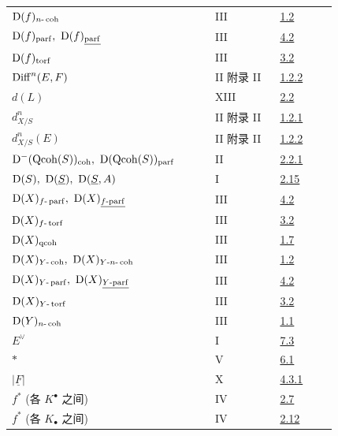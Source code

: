 \begin{longtable}{@{}>{\raggedright\arraybackslash}p{0.50\linewidth}>{\raggedright\arraybackslash}p{0.17\linewidth}>{\raggedright\arraybackslash}p{0.15\linewidth}@{}}
\(\mathrm D(f)_{n\text{-}\operatorname{coh}}\) & III & \hyperlink{sga6.e03.def.1-2}{1.2}\\
\(\Dcat(f)_{\parf},\ \Dcat(f)_{\underline{\mathrm{parf}}}\) & III & \hyperlink{sga6.e03.notation.4-2}{4.2}\\
\(\mathrm D(f)_{\operatorname{torf}}\) & III & \hyperlink{sga6.e03.notation.3-2}{3.2}\\
\(\operatorname{Diff}^n(E,F)\) & II 附录 II & \hyperlink{sga6.e02.para.1-2-2}{1.2.2}\\
\(d(L)\) & XIII & \hyperlink{sga6.e13.para.2-2}{2.2}\\
\(d^n_{X/S}\) & II 附录 II & \hyperlink{sga6.e02.para.1-2-1}{1.2.1}\\
\(d^n_{X/S}(E)\) & II 附录 II & \hyperlink{sga6.e02.para.1-2-2}{1.2.2}\\
\(\Dcat^{-}(\Qcoh(S))_{\coh},\ \Dcat(\Qcoh(S))_{\parf}\) & II & \hyperlink{sga6.e02.notation.2-2-1}{2.2.1}\\
\(\Dcat(S),\ \Dcat(\underline S),\ \Dcat(\underline S,A)\) & I & \hyperlink{sga6.e01.ex.2-15}{2.15}\\
\(\Dcat(X)_{f\text{-}\parf},\ \Dcat(X)_{\underline{f\text{-}\mathrm{parf}}}\) & III & \hyperlink{sga6.e03.notation.4-2}{4.2}\\
\(\mathrm D(X)_{f\text{-}\operatorname{torf}}\) & III & \hyperlink{sga6.e03.notation.3-2}{3.2}\\
\(\mathrm D(X)_{\operatorname{qcoh}}\) & III & \hyperlink{sga6.e03.lem.1-7}{1.7}\\
\(\Dcat(X)_{Y\text{-}\coh},\ \Dcat(X)_{Y\text{-}n\text{-}\coh}\) & III & \hyperlink{sga6.e03.def.1-2}{1.2}\\
\(\Dcat(X)_{Y\text{-}\parf},\ \Dcat(X)_{\underline{Y\text{-}\mathrm{parf}}}\) & III & \hyperlink{sga6.e03.notation.4-2}{4.2}\\
\(\mathrm D(X)_{Y\text{-}\operatorname{torf}}\) & III & \hyperlink{sga6.e03.notation.3-2}{3.2}\\
\(\mathrm D(Y)_{n\text{-}\operatorname{coh}}\) & III & \hyperlink{sga6.e03.thm.1-1}{1.1}\\
\(E^\vee\) & I & \hyperlink{sga6.e01.def.7-3}{7.3}\\
\(*\) & V & \hyperlink{sga6.e05.para.6-1}{6.1}\\
\(|\underline F|\) & X & \hyperlink{sga6.e10.prop.4-3-1}{4.3.1}\\
\(f^*\) (各 \(K^\bullet\) 之间) & IV & \hyperlink{sga6.e04.para.2-7}{2.7}\\
\(f^*\) (各 \(K_\bullet\) 之间) & IV & \hyperlink{sga6.e04.para.2-12}{2.12}\\

\end{longtable}

